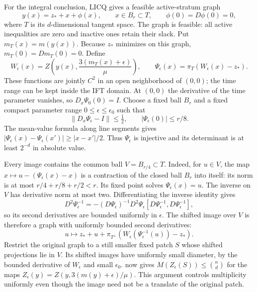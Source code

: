 For the integral conclusion, LICQ gives a feasible active-stratum graph
\[
 y(x)=z_*+x+\phi(x),\qquad x\in B_r\subset T,
 \qquad \phi(0)=D\phi(0)=0,
\]
where $T$ is its $d$-dimensional tangent space. The graph is feasible:
all active inequalities are zero and inactive ones retain their slack.
Put $m_T(x)=m(y(x))$. Because $z_*$ minimizes on this graph,
$m_T(0)=Dm_T(0)=0$. Define
\[
 W_\epsilon(x)=Z\left(y(x),\frac{3(m_T(x)+\epsilon)}\mu\right),
 \qquad
 \Psi_\epsilon(x)=\pi_T(W_\epsilon(x)-z_*).
\]
These functions are jointly $C^2$ in an open neighborhood of $(0,0)$;
the time range can be kept inside the IFT domain. At $(0,0)$ the
derivative of the time parameter vanishes, so
$D_x\Psi_0(0)=I$. Choose a fixed ball $B_r$ and a fixed compact
parameter range $0\leq\epsilon\leq\epsilon_0$ such that
\begin{equation}\label{app:geometry:eq-shift-inverse}
 \|D_x\Psi_\epsilon-I\|\leq\tfrac12,
                 \qquad |\Psi_\epsilon(0)|\leq r/8.
\end{equation}
The mean-value formula along line segments gives
$|\Psi_\epsilon(x)-\Psi_\epsilon(x')|\geq|x-x'|/2$.
Thus $\Psi_\epsilon$ is injective and its determinant is at least
$2^{-d}$ in absolute value.

Every image contains the common ball $V=B_{r/4}\subset T$. Indeed, for
$u\in V$, the map $x\mapsto u-(\Psi_\epsilon(x)-x)$ is a contraction
of the closed ball $B_r$ into itself: its norm is at most
$r/4+r/8+r/2<r$. Its fixed point solves $\Psi_\epsilon(x)=u$.
The inverse on $V$ has derivative norm at most two. Differentiating
the inverse identity gives
\[
 D^2\Psi_\epsilon^{-1}
 =-(D\Psi_\epsilon)^{-1}D^2\Psi_\epsilon
      [D\Psi_\epsilon^{-1},D\Psi_\epsilon^{-1}],
\]
so its second derivatives are bounded uniformly in $\epsilon$.
The shifted image over $V$ is therefore a graph with uniformly bounded
second derivatives:
\[
 u\longmapsto z_*+u+
       \pi_{T^\perp}(W_\epsilon(\Psi_\epsilon^{-1}(u))-z_*).
\]
Restrict the original graph to a still smaller fixed patch $S$ whose
shifted projections lie in $V$. Its shifted images have uniformly
small diameter, by the bounded derivative of $W_\epsilon$ and small
$\epsilon_0$.  now gives
$M(Z_\epsilon(S))\leq\binom nd$ for the maps
$Z_\epsilon(y)=Z(y,3(m(y)+\epsilon)/\mu)$.
This argument controls multiplicity uniformly even though the image
need not be a translate of the original patch.

